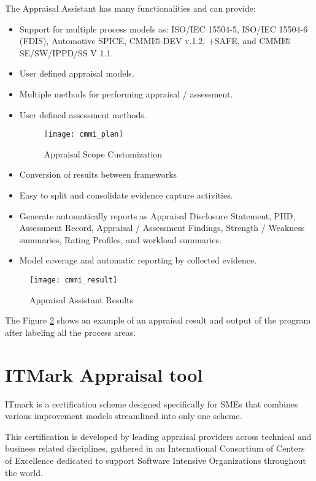 The Appraisal Assistant has many functionalities and can provide:
\begin{itemize}
	\item Support for multiple process models as: ISO/IEC 15504-5, ISO/IEC 15504-6 (FDIS), Automotive SPICE, CMMI®-DEV v.1.2, +SAFE, and CMMI® SE/SW/IPPD/SS V 1.1.
	\item User defined appraisal models.
	\item Multiple methods for performing appraisal / assessment.
	\item User defined assessment methods.
	\begin{figure}[h]
		\begin{center}
			\leavevmode
			\texttt{[image: cmmi\_plan]}
			\caption{Appraisal Scope Customization}
			\label{fig:cmmi_plan}
		\end{center}
	\end{figure}
	\item Conversion of results between frameworks
	\item Easy to split and consolidate evidence capture activities.
	\item Generate automatically reports as Appraisal Disclosure Statement, PIID, Assessment Record, Appraisal / Assessment Findings, Strength / Weakness summaries, Rating Profiles, and workload summaries.
	\item Model coverage and automatic reporting by collected evidence.
\end{itemize}


\begin{figure}[h]
	\begin{center}
		\leavevmode
		\texttt{[image: cmmi\_result]}
		\caption{Appraisal Assistant Results}
		\label{fig:cmmi_result}
	\end{center}
\end{figure}

The Figure \ref{fig:cmmi_result} shows an example of an appraisal result and output of the program after labeling all the process areas.
\newpage


\section{ITMark Appraisal tool}

ITmark \citep{ITMARK} is a certification scheme designed specifically for SMEs that combines various improvement models streamlined into only one scheme.

This certification is developed by leading appraisal providers across technical and business related disciplines, gathered in an International Consortium of Centers of Excellence dedicated to support Software Intensive Organizations throughout the world.


